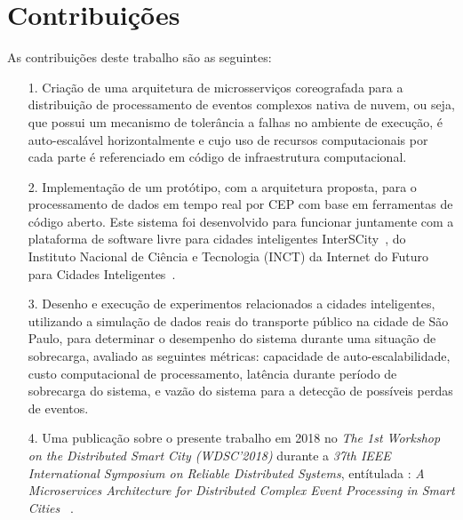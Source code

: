 \section{Contribuições}
\label{sec:contribucoes}
As contribuições deste trabalho são as seguintes:

\begin{itemize}
  \item[1.] Criação de uma arquitetura de microsserviços coreografada para a distribuição de processamento de eventos complexos nativa de nuvem, ou seja, que possui um mecanismo de tolerância a falhas no ambiente de execução, é auto-escalável horizontalmente e cujo uso de recursos computacionais por cada parte é referenciado em código de infraestrutura computacional.

  
  \item[2.] Implementação de um protótipo, com a arquitetura proposta, para o processamento de dados em tempo real por CEP com base em ferramentas de código aberto. Este sistema foi desenvolvido para funcionar juntamente com a plataforma de software livre para cidades inteligentes InterSCity~\citep{del2019design}, do Instituto Nacional de Ciência e Tecnologia (INCT) da Internet do Futuro para Cidades Inteligentes~\citep{Interscitysite}.
  
  
  \item[3.] Desenho e execução de experimentos relacionados a cidades inteligentes, utilizando a simulação de dados reais do transporte público na cidade de São Paulo, para determinar o desempenho do sistema durante uma situação de sobrecarga, avaliado as seguintes métricas: capacidade de auto-escalabilidade, custo computacional de processamento, latência  durante período de sobrecarga do sistema, e vazão do sistema para a detecção de possíveis perdas de eventos.
  
  \item[4.] Uma publicação sobre o presente trabalho em 2018 no \textit{The 1st Workshop on the Distributed Smart City (WDSC'2018)} durante a \textit{37th IEEE International Symposium on Reliable Distributed Systems}, entítulada : \textit{A Microservices Architecture for Distributed Complex Event Processing in Smart Cities} ~\citep{8615650}.
  

\end{itemize}
